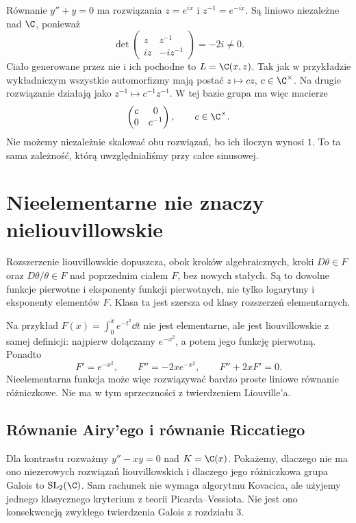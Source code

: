 \begin{przyklad}[Oscylator]
Równanie $y''+y=0$ ma rozwiązania $z=e^{ix}$ i $z^{-1}=e^{-ix}$. Są liniowo niezależne nad $\C$, ponieważ
\[
\det\begin{pmatrix}z&z^{-1}\\iz&-iz^{-1}\end{pmatrix}=-2i\ne0.
\]
Ciało generowane przez nie i ich pochodne to $L=\C(x,z)$. Tak jak w przykładzie wykładniczym wszystkie automorfizmy mają postać $z\mapsto cz$, $c\in\C^\times$. Na drugie rozwiązanie działają jako $z^{-1}\mapsto c^{-1}z^{-1}$. W tej bazie grupa ma więc macierze
\[
\begin{pmatrix}c&0\\0&c^{-1}\end{pmatrix},\qquad c\in\C^\times.
\]
Nie możemy niezależnie skalować obu rozwiązań, bo ich iloczyn wynosi $1$. To ta sama zależność, którą uwzględnialiśmy przy całce sinusowej.
\end{przyklad}

\section{Nieelementarne nie znaczy nieliouvillowskie}

Rozszerzenie liouvillowskie dopuszcza, obok kroków algebraicznych, kroki $D\theta\in F$ oraz $D\theta/\theta\in F$ nad poprzednim ciałem $F$, bez nowych stałych. Są to dowolne funkcje pierwotne i eksponenty funkcji pierwotnych, nie tylko logarytmy i eksponenty elementów $F$. Klasa ta jest szersza od klasy rozszerzeń elementarnych.

Na przykład $F(x)=\int_0^x e^{-t^2}\dd t$ nie jest elementarne, ale jest liouvillowskie z samej definicji: najpierw dołączamy $e^{-x^2}$, a potem jego funkcję pierwotną. Ponadto
\[
F'=e^{-x^2},\qquad F''=-2xe^{-x^2},\qquad F''+2xF'=0.
\]
Nieelementarna funkcja może więc rozwiązywać bardzo proste liniowe równanie różniczkowe. Nie ma w tym sprzeczności z twierdzeniem Liouville'a.

\subsection*{Równanie Airy'ego i równanie Riccatiego}

Dla kontrastu rozważmy $y''-xy=0$ nad $K=\C(x)$. Pokażemy, dlaczego nie ma ono niezerowych rozwiązań liouvillowskich i dlaczego jego różniczkowa grupa Galois to $\mathrm{SL}_2(\C)$. Sam rachunek nie wymaga algorytmu Kovacica, ale użyjemy jednego klasycznego kryterium z teorii Picarda--Vessiota. Nie jest ono konsekwencją zwykłego twierdzenia Galois z rozdziału 3.

